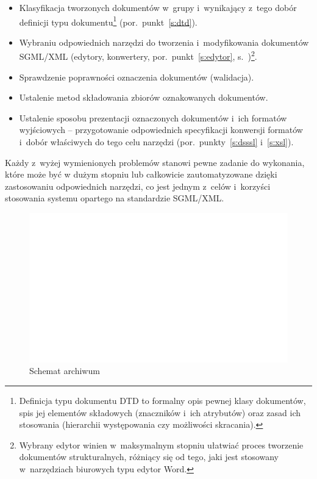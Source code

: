 \documentclass[skorowidz,palatino,brudnopis,xodstep]{wimgr}
\begin{document}
\begin{itemize}
\item Klasyfikacja tworzonych dokumentów w~grupy i~wynikający z~tego
  dobór definicji typu dokumentu\footnote{Definicja typu dokumentu DTD
    to formalny opis pewnej klasy dokumentów, spis jej elementów
    składowych (znaczników i~ich atrybutów) oraz zasad ich stosowania
    (hierarchii występowania czy możliwości skracania).}
  (por.~punkt~\ref{s:dtd}).
\item Wybraniu odpowiednich narzędzi do tworzenia i~modyfikowania
  dokumentów SGML/XML (edytory, konwertery, por.~punkt~\ref{s:edytor},
  s.~\pageref{s:edytor})\footnote{Wybrany edytor winien w~maksymalnym
    stopniu ułatwiać proces tworzenie dokumentów strukturalnych,
    różniący się od tego, jaki jest stosowany w~narzędziach biurowych
    typu edytor Word.}.
\item Sprawdzenie poprawności oznaczenia dokumentów
  (walidacja).
\item Ustalenie metod składowania zbiorów oznakowanych dokumentów.
\item Ustalenie sposobu prezentacji oznaczonych dokumentów i~ich
  formatów wyjściowych -- przygotowanie odpowiednich specyfikacji
  konwersji formatów i~dobór właściwych do tego celu narzędzi
  (por.~punkty~\ref{s:dsssl} i~\ref{s:xsl}).
\end{itemize}

Każdy z~wyżej wymienionych problemów stanowi pewne zadanie do
wykonania, które może być w dużym stopniu lub całkowicie
zautomatyzowane dzięki zastosowaniu odpowiednich narzędzi, co jest
jednym z~celów i~korzyści stosowania systemu opartego na standardzie
SGML/XML.

\begin{figure}[!tbh]
\centering 
\includegraphics[width=.8\hsize]{schemat}
\caption{Schemat archiwum\label{RYS.2}}
\end{figure}
\end{document}
